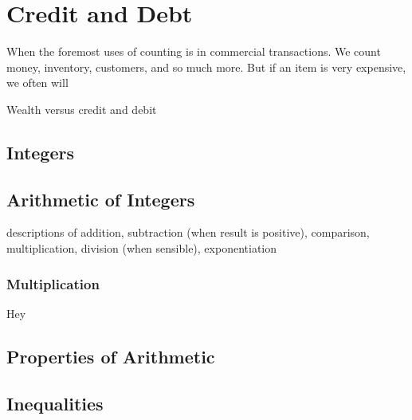 \chapter{Credit and Debt}

 When the foremost uses of counting is in commercial transactions. We count money, inventory, customers, and so much more. But if an item is very expensive, we often will 

Wealth versus credit and debit


\section{Integers}

\section{Arithmetic of Integers}

descriptions of addition, subtraction (when result is positive), comparison, multiplication, division (when sensible), exponentiation

\subsection{Multiplication}

Hey 

\section{Properties of Arithmetic}

\section{Inequalities}

